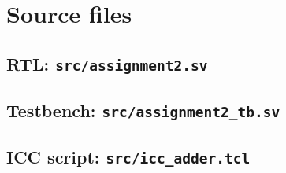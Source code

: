 \documentclass[11pt,a4paper]{article}
\begin{document}
\appendix
\section{Source files}
\subsection*{RTL: \texttt{src/assignment2.sv}}

\subsection*{Testbench: \texttt{src/assignment2\_tb.sv}}

\subsection*{ICC script: \texttt{src/icc\_adder.tcl}}

\end{document}

